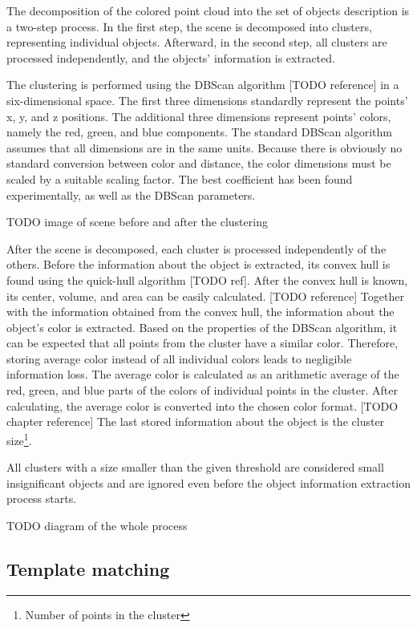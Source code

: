 The decomposition of the colored point cloud into the set of objects description is a two-step process. In the first step, the scene is decomposed into clusters, representing individual objects. Afterward, in the second step, all clusters are processed independently, and the objects' information is extracted.\par
The clustering is performed using the DBScan algorithm [TODO reference] in a six-dimensional space. The first three dimensions standardly represent the points' x, y, and z positions. The additional three dimensions represent points' colors, namely the red, green, and blue components. The standard DBScan algorithm assumes that all dimensions are in the same units. Because there is obviously no standard conversion between color and distance, the color dimensions must be scaled by a suitable scaling factor. The best coefficient has been found experimentally, as well as the DBScan parameters.\par

TODO image of scene before and after the clustering

After the scene is decomposed, each cluster is processed independently of the others. Before the information about the object is extracted,  its convex hull is found using the quick-hull algorithm [TODO ref]. After the convex hull is known, its center, volume, and area can be easily calculated. [TODO reference] Together with the information obtained from the convex hull, the information about the object's color is extracted. Based on the properties of the DBScan algorithm, it can be expected that all points from the cluster have a similar color. Therefore, storing average color instead of all individual colors leads to negligible information loss. The average color is calculated as an arithmetic average of the red, green, and blue parts of the colors of individual points in the cluster. After calculating, the average color is converted into the chosen color format. [TODO chapter reference] The last stored information about the object is the cluster size\footnote{Number of points in the cluster}.\par
All clusters with a size smaller than the given threshold are considered small insignificant objects and are ignored even before the object information extraction process starts.

TODO diagram of the whole process

\subsection{Template matching}


